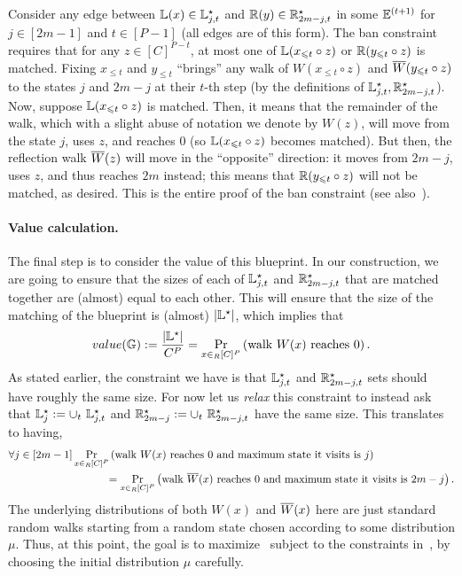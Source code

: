 Consider any edge between $\mathbb{L}(x) \in \mathbb{L}^{\star}_{j,t}$ and $\mathbb{R}(y) \in \mathbb{R}^{\star}_{2m-j,t}$ in some $\mathbb{E}^{(t+1)}$ for $j \in [2m-1]$ and $t \in [P-1]$ (all edges are of this form). The ban constraint requires that for any $z \in [C]^{P-t}$, at most one of $\mathbb{L}(x_{\leqslant t} \circ z)$ or $\mathbb{R}(y_{\leqslant t} \circ z)$ is matched. Fixing $x_{\leq t}$ and $y_{\leq t}$ ``brings'' any walk of $W(x_{\leq t} \circ z)$ and $\overline{W}(y_{\leqslant t} \circ z)$ 
to the states $j$ and $2m-j$ at their $t$-th step (by the definitions of $\mathbb{L}^{\star}_{j,t},\mathbb{R}^{\star}_{2m-j,t}$). Now, suppose $\mathbb{L}(x_{\leqslant t} \circ z)$ is matched. Then, it means that the remainder of the walk, which with a slight abuse of notation we denote by $W(z)$, 
will move from the state $j$, uses $z$, and reaches $0$ (so $\mathbb{L}(x_{\leqslant t} \circ z)$ becomes matched). But then, the reflection walk $\overline{W}(z)$ will move in the ``opposite'' direction: it moves from $2m-j$, uses $z$, and thus reaches $2m$ instead; this means 
that $\mathbb{R}(y_{\leqslant t} \circ z)$ will not be matched, as desired. This is the entire proof of the ban constraint (see also~). 

\paragraph{Value calculation.} The final step is to consider the value of this blueprint. In our construction, we are going to ensure that the sizes of each of $\mathbb{L}^{\star}_{j,t}$ and $\mathbb{R}^{\star}_{2m-j,t}$ that are matched together are 
(almost) equal to each other. This will ensure that the size of the matching of the blueprint is (almost) $\left\vert{\mathbb{L}^{\star}}\right\vert$, which implies that
\begin{align}
	value(\mathbb{G}) := \frac{\left\vert{\mathbb{L}^{\star}}\right\vert}{C^P} = \operatorname*{\textnormal{Pr}}_{x \in_R [C]^P}\left(\text{walk $W(x)$ reaches $0$}\right).  \label{eq:over-value}
\end{align}
As stated earlier, the constraint we have is that $\mathbb{L}^{\star}_{j,t}$ and $\mathbb{R}^{\star}_{2m-j,t}$ sets should have roughly the same size. For now let us \emph{relax} this constraint to instead 
ask that $\mathbb{L}^{\star}_{j} := \cup_t~ \mathbb{L}^{\star}_{j,t}$ and $\mathbb{R}^{\star}_{2m-j} := \cup_t~ \mathbb{R}^{\star}_{2m-j,t}$ have the same size. This translates to having, 
\begin{align}
	&\forall j \in [2m-1] \operatorname*{\textnormal{Pr}}_{x \in_R [C]^P}\left(\text{walk $W(x)$ reaches $0$ and maximum state it visits is $j$}\right) \notag \\
	&\hspace{90pt}= \operatorname*{\textnormal{Pr}}_{x \in_R [C]^P}\left(\text{walk $\overline{W}(x)$ reaches $0$ and maximum state it visits is $2m-j$}\right). \label{eq:over-constraint}
\end{align}
The underlying distributions of both $W(x)$ and $\overline{W}(x)$ here are just standard random walks starting from a random state chosen according to 
some distribution $\mu$. Thus, at this point, the goal is to maximize~ subject to the constraints in~, by choosing
the initial distribution $\mu$ carefully. 

